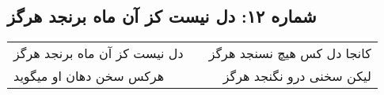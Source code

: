 \begin{center}
\section*{شماره ۱۲: دل نیست کز آن ماه برنجد هرگز}
\label{sec:012}
\begin{longtable}{l p{0.5cm} r}
دل نیست کز آن ماه برنجد هرگز
&&
کانجا دل کس هیچ نسنجد هرگز
\\
هرکس سخن دهان او میگوید
&&
لیکن سخنی درو نگنجد هرگز
\\
\end{longtable}
\end{center}
